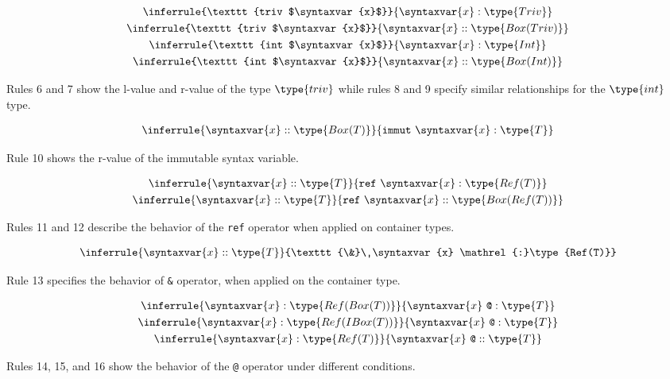 \documentclass{article}
\newcommand\rtypeof{\mathrel{:}}
\newcommand\ltypeof{\mathrel{::}}
\newcommand{\syntax}{\texttt}
\begin{document}
\begin{gather}
  \inferrule{\syntax{triv $\syntaxvar{x}$}}{\syntaxvar{x} \rtypeof \type{Triv}}\\
  \inferrule{\syntax{triv $\syntaxvar{x}$}}{\syntaxvar{x} \ltypeof \type{Box(Triv)}}\\
  \inferrule{\syntax{int $\syntaxvar{x}$}}{\syntaxvar{x} \rtypeof \type{Int}}\\
  \inferrule{\syntax{int $\syntaxvar{x}$}}{\syntaxvar{x} \ltypeof \type{Box(Int)}}
\end{gather}

Rules 6 and 7 show the l-value and r-value of the type $\type{triv}$ while
rules 8 and 9 specify similar relationships for the $\type{int}$ type.

\begin{gather}
  \inferrule{\syntaxvar{x} \ltypeof \type{Box(T)}}{\syntax{immut}\ \syntaxvar{x} \rtypeof \type{T}}
\end{gather}

Rule 10 shows the r-value of the immutable syntax variable.

\begin{gather}
  \inferrule{\syntaxvar{x} \ltypeof \type{T}}{\syntax{ref}\ \syntaxvar{x} \rtypeof \type{Ref(T)}}\\
  \inferrule{\syntaxvar{x} \ltypeof \type{T}}{\syntax{ref}\ \syntaxvar{x} \ltypeof \type{Box(Ref(T))}}
\end{gather}

Rules 11 and 12 describe the behavior of the \syntax{ref} operator when applied
on container types.

\begin{gather}
  \inferrule{\syntaxvar{x} \ltypeof \type{T}}{\syntax{\&}\ \syntaxvar{x} \rtypeof \type{Ref(T)}}
\end{gather}

Rule 13 specifies the behavior of \syntax{\&} operator, when applied on the
container type.

\begin{gather}
  \inferrule{\syntaxvar{x} \rtypeof \type{Ref(Box(T))}}{\syntaxvar{x}\ \syntax{@} \rtypeof \type{T}}\\
  \inferrule{\syntaxvar{x} \rtypeof \type{Ref(IBox(T))}}{\syntaxvar{x}\ \syntax{@} \rtypeof \type{T}}\\
  \inferrule{\syntaxvar{x} \rtypeof \type{Ref(T)}}{\syntaxvar{x}\ \syntax{@} \ltypeof \type{T}}
\end{gather}

Rules 14, 15, and 16 show the behavior of the \syntax{@} operator under
different conditions.
\end{document}
